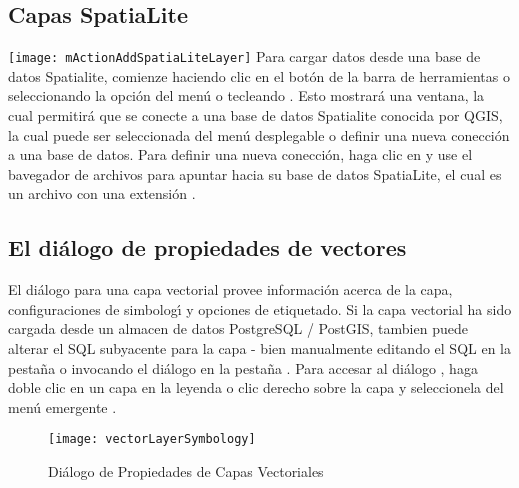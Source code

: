 \subsection{Capas SpatiaLite} 
\label{label_spatialite} 

\texttt{[image: mActionAddSpatiaLiteLayer]}
Para cargar datos desde una base de datos Spatialite, comienze haciendo clic en el bot\'on de la barra 
de herramientas  o seleccionando la opci\'on  
 del men\'u o tecleando . 
Esto mostrar\'a una ventana, la cual permitir\'a que se conecte a una base de datos Spatialite conocida por QGIS, la cual 
puede ser seleccionada del men\'u desplegable o definir una nueva conecci\'on a una base de datos. Para definir una nueva conecci\'on, haga clic en  y use el bavegador de archivos para apuntar hacia su base de datos SpatiaLite, 
el cual es un archivo con una extensi\'on .

\subsection{El di\'alogo de propiedades de vectores}\label{sec:vectorprops}

El di\'alogo  para una capa vectorial 
provee informaci\'on acerca de la capa, configuraciones
de simbolog\'{\i} y opciones de etiquetado. Si la capa vectorial ha sido cargada desde
un almacen de datos PostgreSQL / PostGIS, tambien puede alterar el SQL subyacente para la
capa - bien manualmente editando el SQL en la pesta\~na  o invocando
el di\'alogo  en la pesta\~na . 
Para accesar al di\'alogo
, haga doble clic en un capa en la leyenda o clic derecho sobre
la capa y seleccionela del men\'u emergente .

\begin{figure}[H]
   \begin{center}
   \caption{Di\'alogo de Propiedades de Capas Vectoriales \nixcaption}\label{fig:vector_symbology}\smallskip
   \texttt{[image: vectorLayerSymbology]} 
\end{center}  
\end{figure}

